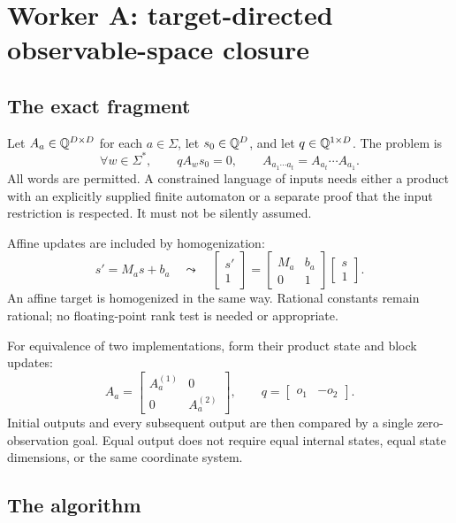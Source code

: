 \section{Worker A: target-directed observable-space closure}
\label{sec:linear}

\subsection{The exact fragment}

Let $A_a\in\mathbb Q^{D\times D}$ for each $a\in\Sigma$, let $s_0\in\mathbb Q^D$, and let
$q\in\mathbb Q^{1\times D}$. The problem is
\begin{equation}\label{eq:linear-goal}
 \forall w\in\Sigma^*,\qquad q A_w s_0=0,
 \qquad A_{a_1\cdots a_t}=A_{a_t}\cdots A_{a_1}.
\end{equation}
All words are permitted. A constrained language of inputs needs either a product
with an explicitly supplied finite automaton or a separate proof that the input
restriction is respected. It must not be silently assumed.

Affine updates are included by homogenization:
\[
 s'=M_as+b_a
 \quad\leadsto\quad
 \begin{bmatrix}s'\\1\end{bmatrix}
 =\begin{bmatrix}M_a&b_a\\0&1\end{bmatrix}
  \begin{bmatrix}s\\1\end{bmatrix}.
\]
An affine target is homogenized in the same way. Rational constants remain
rational; no floating-point rank test is needed or appropriate.

For equivalence of two implementations, form their product state and block
updates:
\[
 A_a=\begin{bmatrix}A_a^{(1)}&0\\0&A_a^{(2)}\end{bmatrix},\qquad
 q=\begin{bmatrix}o_1&-o_2\end{bmatrix}.
\]
Initial outputs and every subsequent output are then compared by a single
zero-observation goal. Equal output does not require equal internal states,
equal state dimensions, or the same coordinate system.

\subsection{The algorithm}

